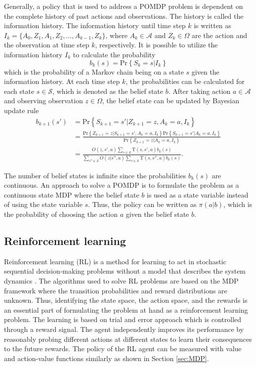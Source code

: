 \documentclass[english, 12pt, a4paper, elec, utf8, a-1b, online]{aaltothesis}
\newcommand{\Ss}{\mathcal{S}}
\newcommand{\As}{\mathcal{A}}
\newcommand{\Os}{\Omega}
\newcommand{\Op}{O}
\renewcommand{\Pr}[1]{\text{Pr}\left\{ #1 \right\}}
\begin{document}
Generally, a policy that is used to address a POMDP problem is dependent on the complete history of past actions and observations. 
The history is called the information history.
The information history until time step $k$ is written as $I_k=\{A_0, Z_1, A_1, Z_2, ..., A_{k-1}, Z_{k}\}$, where $A_k \in \As$ and $Z_k \in \Os$ are the action and the observation at time step $k$, respectively.
It is possible to utilize the information history $I_k$ to calculate the probability
\begin{equation}
    b_k(s) = \Pr{S_k=s|I_k}
\end{equation}
which is the probability of a Markov chain being on a state $s$ given the information history.
At each time step $k$, the probabilities can be calculated for each state $s \in \Ss$, which is denoted as the belief state $b$.
After taking action $a \in \As$ and observing observation $z \in \Os$, the belief state can be updated by Bayesian update rule
\begin{align}
    b_{k+1}(s') 
    &= \Pr{S_{k+1}=s' | Z_{k+1}=z, A_k=a, I_k} \\
    &= \frac
        {\Pr{Z_{k+1}=z | S_{k+1}=s' , A_k=a, I_k} \Pr{S_{k+1}=s'| A_k=a, I_k}}
        {\Pr{Z_{k+1}=z | A_k=a, I_k}} \\
    &= \frac
        {\Op(z, s', a) \sum_{s \in \Ss} \mathrm{T}(s, s', a) b_k(s)}
        {\sum_{s''  \in \Ss}  \Op(z | s'', a) \sum_{s \in \Ss} \mathrm{T}(s, s'', a) b_k(s) }  \label{eq:belief_state_update}.
\end{align}

The number of belief states is infinite since the probabilities $b_k(s)$ are continuous.
An approach to solve a POMDP is to formulate the problem as a continuous state MDP where the belief state $b$ is used as a state variable instead of using the state variable $s$.
Thus, the policy can be written as $\pi(a | b)$, which is the probability of choosing the action $a$ given the belief state $b$.

\subsection{Reinforcement learning} \label{sec:RL}

Reinforcement learning (RL) is a method for learning to act in stochastic sequential decision-making problems without a model that describes the system dynamics \cite{Sutton2018}.
The algorithms used to solve RL problems are based on the MDP framework where the transition probabilities and reward distributions are unknown.
Thus, identifying the state space, the action space, and the rewards is an essential part of formulating the problem at hand as a reinforcement learning problem.
The learning is based on trial and error approach which is controlled through a reward signal.
The agent independently improves its performance by reasonably probing different actions at different states to learn their consequences to the future rewards.
The policy of the RL agent can be measured with value and action-value functions similarly as shown in Section \ref{sec:MDP}.
\end{document}
